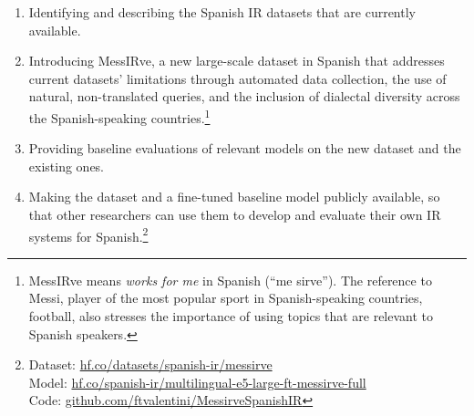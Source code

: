 \documentclass[11pt]{article}
\begin{document}
\begin{enumerate}[wide, itemindent=\labelsep, itemsep=0pt]

  \item Identifying and describing the Spanish IR datasets that are currently available.

  \item Introducing MessIRve, a new large-scale dataset in Spanish that addresses current datasets' limitations through automated data collection, the use of natural, non-translated queries, and the inclusion of dialectal diversity across the Spanish-speaking countries.\footnote{MessIRve means \emph{works for me} in Spanish (``me sirve''). The reference to Messi, player of the most popular sport in Spanish-speaking countries, football, also stresses the importance of using topics that are relevant to Spanish speakers.}

  \item Providing baseline evaluations of relevant models on the new dataset and the existing ones.

  \item Making the dataset and a fine-tuned baseline model publicly available, so that other researchers can use them to develop and evaluate their own IR systems for Spanish.\footnote{
      Dataset: \href{https://huggingface.co/datasets/spanish-ir/messirve}{hf.co/datasets/spanish-ir/messirve} \\
      Model: \href{https://huggingface.co/spanish-ir/multilingual-e5-large-ft-messirve-full}{hf.co/spanish-ir/multilingual-e5-large-ft-messirve-full} \\
      Code: \href{https://github.com/ftvalentini/MessirveSpanishIR}{github.com/ftvalentini/MessirveSpanishIR}
  }

\end{enumerate}
\end{document}
